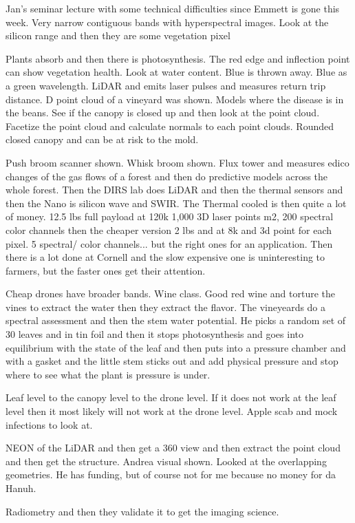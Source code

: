 \documentclass{article}
\begin{document}
Jan's seminar lecture with some technical difficulties since Emmett is gone this week. Very narrow contiguous bands with hyperspectral images. Look at the silicon range and then they are some vegetation pixel

Plants absorb and then there is photosynthesis. The red edge and inflection point can show vegetation health. Look at water content. Blue is thrown away.  Blue as a green wavelength. LiDAR and emits laser pulses and measures return trip distance. 
D point cloud of a vineyard was shown. Models where the disease is in the beans. See if the canopy is closed up and then look at the point cloud. Facetize the point cloud and calculate normals to each point clouds. Rounded closed canopy and can be at risk to the mold. 

Push broom scanner shown. Whisk broom shown. Flux tower and measures edico changes of the gas flows of a forest and then do predictive models across the whole forest. Then the DIRS lab does LiDAR and then the thermal sensors and then the Nano is silicon wave and SWIR. The Thermal cooled is then quite a lot of money. 12.5 lbs full payload at 120k 1,000 3D laser points m2, 200 spectral color channels then the cheaper version 2 lbs and at 8k and 3d point for each pixel. 5 spectral/ color channels... but the right ones for an application. Then there is a lot done at Cornell and the slow expensive one is uninteresting to farmers, but the faster ones get their attention. 

Cheap drones have broader bands. Wine class. Good red wine and torture the vines to extract the water then they extract the flavor. The vineyeards do a spectral assessment and then the stem water potential. He picks a random set of 30 leaves and in tin foil and then it stops photosynthesis and goes into equilibrium with the state of the leaf and then puts into a pressure chamber and with a gasket and the little stem sticks out and add physical pressure and stop where to see what the plant is pressure is under. 

Leaf level to the canopy level to the drone level. If it does not work at the leaf level then it most likely will not work at the drone level. 
Apple scab and mock infections to look at. 

NEON of the LiDAR and then get a 360 view and then extract the point cloud and then get the structure. Andrea visual shown. Looked at the overlapping geometries. He has funding, but of course not for me because no money for da Hanuh. 

Radiometry and then they validate it to get the imaging science. 
\end{document}
